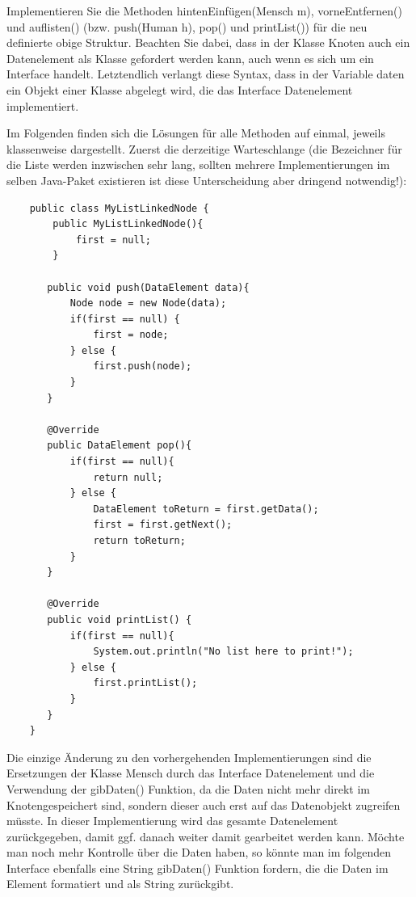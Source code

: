 \documentclass{article}
\begin{document}
\begin{task}{2}
    Implementieren Sie die Methoden hintenEinfügen(Mensch m), vorneEntfernen() und auflisten() (bzw. push(Human h), pop() und printList()) für die neu definierte obige Struktur. Beachten Sie dabei, dass in der Klasse Knoten auch ein Datenelement als Klasse gefordert werden kann, auch wenn es sich um ein Interface handelt. Letztendlich verlangt diese Syntax, dass in der Variable daten ein Objekt einer Klasse abgelegt wird, die das Interface Datenelement implementiert.
\end{task}

Im Folgenden finden sich die Lösungen für alle Methoden auf einmal, jeweils klassenweise dargestellt. Zuerst die derzeitige Warteschlange (die Bezeichner für die Liste werden inzwischen sehr lang, sollten mehrere Implementierungen im selben Java-Paket existieren ist diese Unterscheidung aber dringend notwendig!): 
\begin{verbatim}
    public class MyListLinkedNode {
        public MyListLinkedNode(){
            first = null;
        }

       public void push(DataElement data){
           Node node = new Node(data);
           if(first == null) {
               first = node;
           } else {
               first.push(node);
           }
       }

       @Override
       public DataElement pop(){
           if(first == null){
               return null;
           } else {
               DataElement toReturn = first.getData();
               first = first.getNext();
               return toReturn;
           }
       }

       @Override
       public void printList() {
           if(first == null){
               System.out.println("No list here to print!");
           } else {
               first.printList();
           }
       }
    }
\end{verbatim}
Die einzige Änderung zu den vorhergehenden Implementierungen sind die Ersetzungen der Klasse Mensch durch das Interface Datenelement und die Verwendung der gibDaten() Funktion, da die Daten nicht mehr direkt im Knotengespeichert sind, sondern dieser auch erst auf das Datenobjekt zugreifen müsste. In dieser Implementierung wird das gesamte Datenelement zurückgegeben, damit ggf. danach weiter damit gearbeitet werden kann. Möchte man noch mehr Kontrolle über die Daten haben, so könnte man im folgenden Interface ebenfalls eine String gibDaten() Funktion fordern, die die Daten im Element formatiert und als String zurückgibt.
\end{document}
